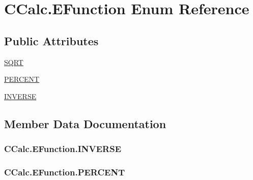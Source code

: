 \hypertarget{enum_c_calc_1_1_e_function}{}\section{C\+Calc.\+E\+Function Enum Reference}
\label{enum_c_calc_1_1_e_function}
\subsection*{Public Attributes}
\begin{DoxyCompactItemize}
\item 
\hyperlink{enum_c_calc_1_1_e_function_a0eb88b2abee0f892a6c9c02f1e244f2e}{S\+Q\+RT}
\item 
\hyperlink{enum_c_calc_1_1_e_function_a9f788c7618b6ef4f3445a3409751f32c}{P\+E\+R\+C\+E\+NT}
\item 
\hyperlink{enum_c_calc_1_1_e_function_a101d850f5b56a7b49ad1f3df80a31f9c}{I\+N\+V\+E\+R\+SE}
\end{DoxyCompactItemize}


\subsection{Member Data Documentation}
\subsubsection[{\texorpdfstring{I\+N\+V\+E\+R\+SE}{INVERSE}}]{\setlength{\rightskip}{0pt plus 5cm}C\+Calc.\+E\+Function.\+I\+N\+V\+E\+R\+SE}\hypertarget{enum_c_calc_1_1_e_function_a101d850f5b56a7b49ad1f3df80a31f9c}{}\label{enum_c_calc_1_1_e_function_a101d850f5b56a7b49ad1f3df80a31f9c}
\subsubsection[{\texorpdfstring{P\+E\+R\+C\+E\+NT}{PERCENT}}]{\setlength{\rightskip}{0pt plus 5cm}C\+Calc.\+E\+Function.\+P\+E\+R\+C\+E\+NT}\hypertarget{enum_c_calc_1_1_e_function_a9f788c7618b6ef4f3445a3409751f32c}{}\label{enum_c_calc_1_1_e_function_a9f788c7618b6ef4f3445a3409751f32c}
